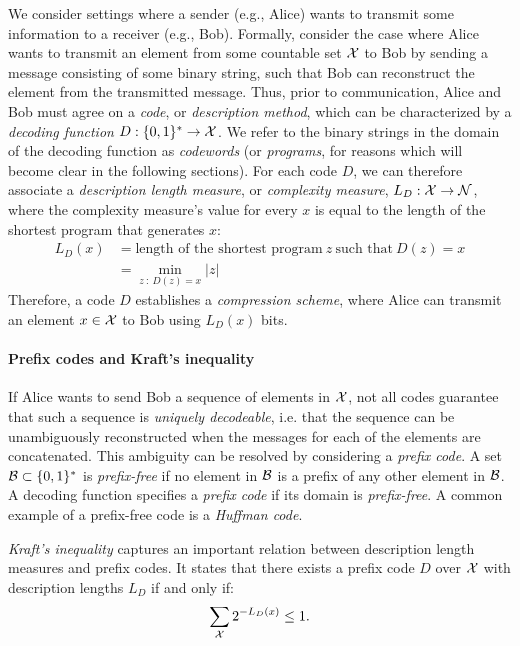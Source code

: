 We consider settings where a sender (e.g., Alice) wants to transmit some information to a receiver (e.g., Bob). Formally, consider the case where Alice wants to transmit an element from some countable set ${\mathcal{X}}$ to Bob by sending a message consisting of some binary string, such that Bob can reconstruct the element from the transmitted message. Thus, prior to communication, Alice and Bob must agree on a \emph{code}, or \emph{description method}, which can be characterized by a \emph{decoding function} $D : \{0,1\}^* \rightarrow {\mathcal{X}}$. We refer to the binary strings in the domain of the decoding function as \emph{codewords} (or \emph{programs}, for reasons which will become clear in the following sections). For each code $D$, we can therefore associate a \emph{description length measure}, or \emph{complexity measure}, $L_D: {\mathcal{X}} \rightarrow {\mathcal{N}}$, where the complexity measure's value for every $x$ is equal to the length of the shortest program that generates $x$:
\begin{align}
    L_D(x) &= \text{length of the shortest  program}~z~\text{such that}~D(z)=x \nonumber \\ 
        &= \min_{z  ~:~ D(z) = x} |z| \label{eq:description-length2}
\end{align}
Therefore, a code $D$ establishes a \emph{compression scheme}, where Alice can transmit an element $x \in {\mathcal{X}}$ to Bob using $L_D(x)$ bits.

\paragraph{Prefix codes and Kraft's inequality} If Alice wants to send Bob a sequence of elements in ${\mathcal{X}}$, not all codes guarantee that such a sequence is \emph{uniquely decodeable}, i.e. that the sequence can be unambiguously reconstructed when the messages for each of the elements are concatenated. This ambiguity can be resolved by considering a \emph{prefix code}. A set ${\mathcal{B}} \subset \{0,1\}^*$ is \emph{prefix-free} if no element in ${\mathcal{B}}$ is a prefix of any other element in ${\mathcal{B}}$. A decoding function specifies a \emph{prefix code} if its domain is \emph{prefix-free}. A common example of a prefix-free code is a \emph{Huffman code}.

\emph{Kraft's inequality} captures an important relation between description length measures and prefix codes. It states that there exists a prefix code $D$ over ${\mathcal{X}}$ with description lengths $L_D$ if and only if:
\begin{equation}
\sum_{\mathcal{X}} 2^{-L_D(x)} \leq 1.
\label{eq:kraft-inequality}
\end{equation}


